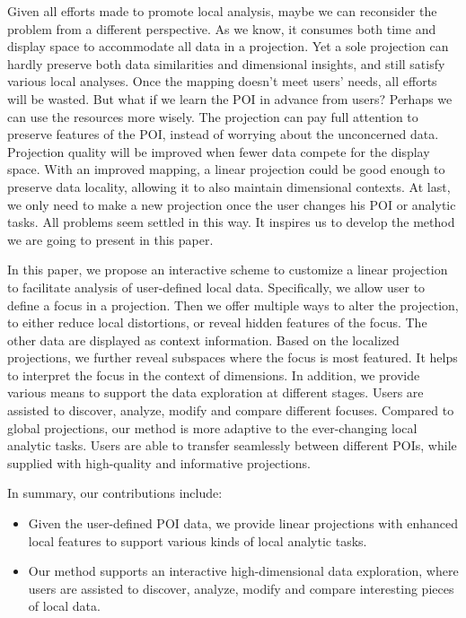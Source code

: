 Given all efforts made to promote local analysis, maybe we can reconsider the problem from a different perspective. As we know, it consumes both time and display space to accommodate all data in a projection. Yet a sole projection can hardly preserve both data similarities and dimensional insights, and still satisfy various local analyses. Once the mapping doesn't meet users' needs, all efforts will be wasted. But what if we learn the POI in advance from users? Perhaps we can use the resources more wisely. The projection can pay full attention to preserve features of the POI, instead of worrying about the unconcerned data. Projection quality will be improved when fewer data compete for the display space. With an improved mapping, a linear projection could be good enough to preserve data locality, allowing it to also maintain dimensional contexts. At last, we only need to make a new projection once the user changes his POI or analytic tasks. All problems seem settled in this way. It inspires us to develop the method we are going to present in this paper.

In this paper, we propose an interactive scheme to customize a linear projection to facilitate analysis of user-defined local data. Specifically, we allow user to define a focus in a projection. Then we offer multiple ways to alter the projection, to either reduce local distortions, or reveal hidden features of the focus. The other data are displayed as context information. Based on the localized projections, we further reveal subspaces where the focus is most featured. It helps to interpret the focus in the context of dimensions. In addition, we provide various means to support the data exploration at different stages. Users are assisted to discover, analyze, modify and compare different focuses. Compared to global projections, our method is more adaptive to the ever-changing local analytic tasks. Users are able to transfer seamlessly between different POIs, while supplied with high-quality and informative projections.

In summary, our contributions include:
\begin{itemize}
\item Given the user-defined POI data, we provide linear projections with enhanced local features to support various kinds of local analytic tasks.
\item Our method supports an interactive high-dimensional data exploration, where users are assisted to discover, analyze, modify and compare interesting pieces of local data.
\end{itemize}

